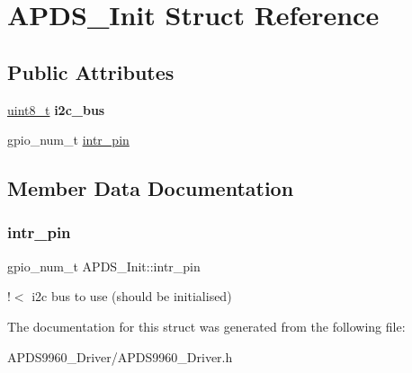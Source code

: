 \hypertarget{structAPDS__Init}{}\section{A\+P\+D\+S\+\_\+\+Init Struct Reference}
\label{structAPDS__Init}
\subsection*{Public Attributes}
\begin{DoxyCompactItemize}
\item 
\mbox{\label{structAPDS__Init_a701992ac82c11149cc7836cb0b0e1027}} 
\hyperlink{vl53l0x__types_8h_aba7bc1797add20fe3efdf37ced1182c5}{uint8\+\_\+t} {\bfseries i2c\+\_\+bus}
\item 
gpio\+\_\+num\+\_\+t \hyperlink{structAPDS__Init_a387fbf2b939af62c370c8e1b51371df3}{intr\+\_\+pin}
\end{DoxyCompactItemize}


\subsection{Member Data Documentation}
\mbox{\label{structAPDS__Init_a387fbf2b939af62c370c8e1b51371df3}} 
\subsubsection{\texorpdfstring{intr\+\_\+pin}{intr\_pin}}
{\footnotesize\ttfamily gpio\+\_\+num\+\_\+t A\+P\+D\+S\+\_\+\+Init\+::intr\+\_\+pin}

!$<$ i2c bus to use (should be initialised) 

The documentation for this struct was generated from the following file\+:\begin{DoxyCompactItemize}
\item 
A\+P\+D\+S9960\+\_\+\+Driver/A\+P\+D\+S9960\+\_\+\+Driver.\+h\end{DoxyCompactItemize}
